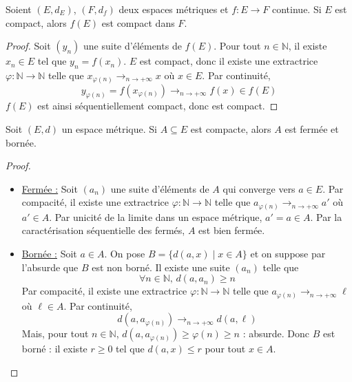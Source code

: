 





  \nocite{[DAN]}
  \nocite{[GOU20]}

  \begin{proposition}
    \label{autour-de-la-compacite-1}
    Soient $(E,d_E)$, $(F,d_f)$ deux espaces métriques et $f : E \rightarrow F$ continue. Si $E$ est compact, alors $f(E)$ est compact dans $F$.
  \end{proposition}

  \begin{proof}
    Soit $(y_n)$ une suite d'éléments de $f(E)$. Pour tout $n \in \mathbb{N}$, il existe $x_n \in E$ tel que $y_n = f(x_n)$. $E$ est compact, donc il existe une extractrice $\varphi : \mathbb{N} \rightarrow \mathbb{N}$ telle que $x_{\varphi(n)} \longrightarrow_{n \rightarrow +\infty} x$ où $x \in E$. Par continuité,
    \[ y_{\varphi(n)} = f(x_{\varphi(n)}) \longrightarrow_{n \rightarrow +\infty} f(x) \in f(E) \]
    $f(E)$ est ainsi séquentiellement compact, donc est compact.
  \end{proof}

  \begin{proposition}
    \label{autour-de-la-compacite-2}
    Soit $(E,d)$ un espace métrique. Si $A \subseteq E$ est compacte, alors $A$ est fermée et bornée.
  \end{proposition}

  \begin{proof}
    \begin{itemize}
      \item \uline{Fermée :} Soit $(a_n)$ une suite d'éléments de $A$ qui converge vers $a \in E$. Par compacité, il existe une extractrice $\varphi : \mathbb{N} \rightarrow \mathbb{N}$ telle que $a_{\varphi(n)} \longrightarrow_{n \rightarrow +\infty} a'$ où $a' \in A$. Par unicité de la limite dans un espace métrique, $a' = a \in A$. Par la caractérisation séquentielle des fermés, $A$ est bien fermée.
      \item \uline{Bornée :} Soit $a \in A$. On pose $B = \{ d(a,x) \mid x \in A \}$ et on suppose par l'absurde que $B$ est non borné. Il existe une suite $(a_n)$ telle que
      \[ \forall n \in \mathbb{N}, \, d(a, a_n) \geq n \]
      Par compacité, il existe une extractrice $\varphi : \mathbb{N} \rightarrow \mathbb{N}$ telle que $a_{\varphi(n)} \longrightarrow_{n \rightarrow +\infty} \ell$ où $\ell \in A$. Par continuité,
      \[ d(a, a_{\varphi(n)}) \longrightarrow_{n \rightarrow +\infty} d(a, \ell) \]
      Mais, pour tout $n \in \mathbb{N}$, $d(a, a_{\varphi(n)}) \geq \varphi(n) \geq n$ : absurde. Donc $B$ est borné : il existe $r \geq 0$ tel que $d(a,x) \leq r$ pour tout $x \in A$.
    \end{itemize}
  \end{proof}

